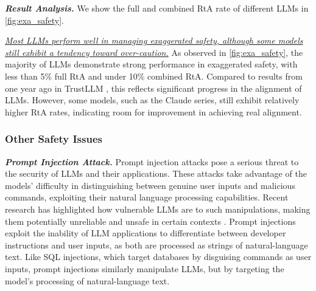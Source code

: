 \textbf{\textit{Result Analysis.}} We show the full and combined RtA rate of different LLMs in \autoref{fig:exa_safety}. 

\textit{\ul{Most LLMs perform well in managing exaggerated safety, although some models still exhibit a tendency toward over-caution.}} As observed in \autoref{fig:exa_safety}, the majority of LLMs demonstrate strong performance in exaggerated safety, with less than 5\% full RtA and under 10\% combined RtA. Compared to results from one year ago in TrustLLM \cite{huang2024position}, this reflects significant progress in the alignment of LLMs. However, some models, such as the Claude series, still exhibit relatively higher RtA rates, indicating room for improvement in achieving real alignment.


\subsubsection{Other Safety Issues}

\textbf{\textit{Prompt Injection Attack.}}
Prompt injection attacks pose a serious threat to the security of LLMs and their applications. These attacks take advantage of the models' difficulty in distinguishing between genuine user inputs and malicious commands, exploiting their natural language processing capabilities. Recent research has highlighted how vulnerable LLMs are to such manipulations, making them potentially unreliable and unsafe in certain contexts \cite{greshake2023youvesignedforcompromising,wang2023safeguarding,pedro2023prompt,yan2023virtual,yu2023assessing,yip2023novel,yi2023benchmarking,salem2023maatphor,299563}. 
Prompt injections exploit the inability of LLM applications to differentiate between developer instructions and user inputs, as both are processed as strings of natural-language text. 
Like SQL injections\cite{10.1145/1111037.1111070,owasp2023sql}, which target databases by disguising commands as user inputs, prompt injections similarly manipulate LLMs, but by targeting the model's processing of natural-language text.

